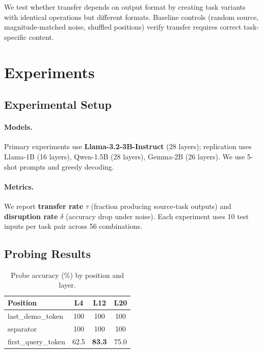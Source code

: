 \documentclass{article}
\begin{document}
We test whether transfer depends on output format by creating task variants with identical operations but different formats. Baseline controls (random source, magnitude-matched noise, shuffled positions) verify transfer requires correct task-specific content.

\section{Experiments}
\label{sec:experiments}

\subsection{Experimental Setup}

\paragraph{Models.} Primary experiments use \textbf{Llama-3.2-3B-Instruct} (28 layers); replication uses Llama-1B (16 layers), Qwen-1.5B \citep{bai2023qwen} (28 layers), Gemma-2B \citep{team2024gemma} (26 layers). We use 5-shot prompts and greedy decoding.

\paragraph{Metrics.} We report \textbf{transfer rate} $\tau$ (fraction producing source-task outputs) and \textbf{disruption rate} $\delta$ (accuracy drop under noise). Each experiment uses 10 test inputs per task pair across 56 combinations.

\subsection{Probing Results}

\begin{table}
\vspace{-12pt}
\centering
\small
\caption{Probe accuracy (\%) by position and layer.}
\label{tab:probing}
\begin{tabular}{@{}lccc@{}}
\toprule
Position & L4 & L12 & L20 \\
\midrule
last\_demo\_token & 100 & 100 & 100 \\
separator & 100 & 100 & 100 \\
first\_query\_token & 62.5 & \textbf{83.3} & 75.0 \\
\bottomrule
\end{tabular}
\vspace{-10pt}
\end{table}
\end{document}
